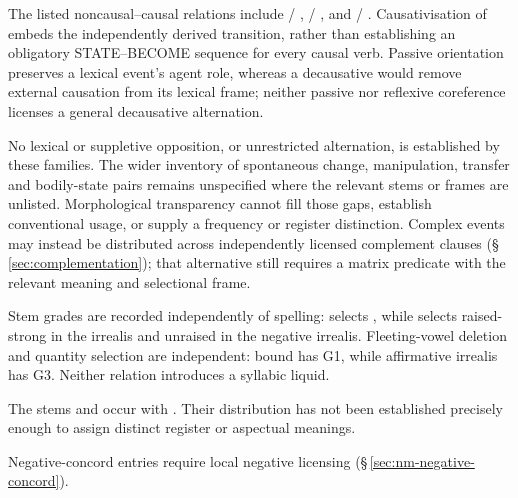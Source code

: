 The listed noncausal--causal relations include /
, /
, and /
. Causativisation of  embeds the
independently derived transition, rather than establishing an obligatory
STATE--BECOME sequence for every causal verb. Passive orientation preserves
a lexical event's agent role, whereas a decausative would remove external
causation from its lexical frame; neither passive  nor reflexive
coreference licenses a general decausative alternation.

No lexical or suppletive  opposition, or unrestricted
 alternation, is established by these families. The wider
inventory of spontaneous change, manipulation, transfer and bodily-state
pairs remains unspecified where the relevant stems or frames are unlisted.
Morphological transparency cannot fill those gaps, establish conventional
usage, or supply a frequency or register distinction. Complex events may
instead be distributed across independently licensed complement clauses
(§\,\ref{sec:complementation}); that alternative still requires a matrix
predicate with the relevant meaning and selectional frame.

Stem grades are recorded independently of spelling:  selects
, while  selects raised-strong  in the
irrealis and unraised  in the negative irrealis. Fleeting-vowel deletion and quantity selection are independent: bound
 has G1, while affirmative irrealis  has G3.
Neither relation introduces a syllabic liquid.

The stems  and  occur with .
Their distribution has not been established precisely enough to assign
distinct register or aspectual meanings.

Negative-concord entries require local
negative licensing (§\,\ref{sec:nm-negative-concord}).
